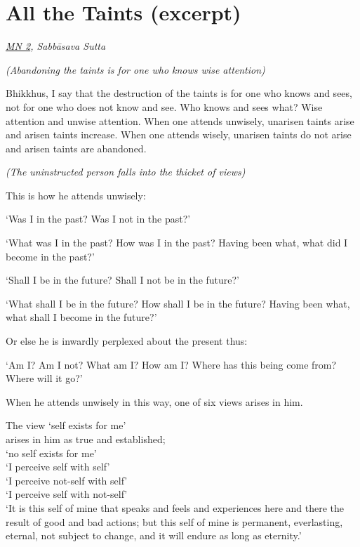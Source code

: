 \clearpage

\section{All the Taints (excerpt)}

{\centering
\emph{\href{https://suttacentral.net/mn2/en/bodhi}{MN 2}, Sabbāsava Sutta}
\par}

{
\setlength{\parindent}{0pt}\setlength{\parskip}{5pt}
\fontsize{9.5}{14}\selectfont

\emph{(Abandoning the taints is for one who knows wise attention)}

Bhikkhus, I say that the destruction of the taints is for one who knows and
sees, not for one who does not know and see. Who knows and sees what? Wise
attention and unwise attention. When one attends unwisely, unarisen taints arise
and arisen taints increase. When one attends wisely, unarisen taints do not
arise and arisen taints are abandoned.

\emph{(The uninstructed person falls into the thicket of views)}

This is how he attends unwisely:

`Was I in the past? Was I not in the past?'

`What was I in the past? How was I in the past? Having been what, what did I become in the past?'

`Shall I be in the future? Shall I not be in the future?'

`What shall I be in the future? How shall I be in the future? Having been what, what shall I become in the future?'

Or else he is inwardly perplexed about the present thus:

`Am I? Am I not? What am I? How am I? Where has this being come from? Where will it go?'

When he attends unwisely in this way, one of six views arises in him.

The view `self exists for me'\\
arises in him as true and established;\\
`no self exists for me'\\
`I perceive self with self'\\
`I perceive not-self with self'\\
`I perceive self with not-self'\\
`It is this self of mine that speaks and feels and experiences here
and there the result of good and bad actions; but this self of mine is
permanent, everlasting, eternal, not subject to change, and it will
endure as long as eternity.'

}
